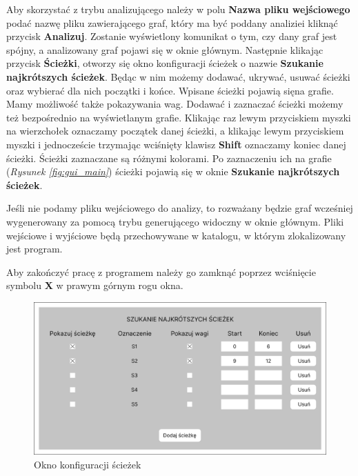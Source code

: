 \documentclass{article}
\begin{document}
\newpage

Aby skorzystać z trybu analizującego należy w polu \textbf{Nazwa pliku wejściowego} podać nazwę pliku zawierającego graf, który ma być poddany analizie\linebreak i kliknąć przycisk \textbf{Analizuj}. Zostanie wyświetlony komunikat o tym, czy dany graf jest spójny, a analizowany graf pojawi się w oknie głównym.
Następnie klikając przycisk \textbf{Ścieżki}, otworzy się okno konfiguracji ścieżek o nazwie \textbf{Szukanie najkrótszych ścieżek}. Będąc w nim możemy dodawać, ukrywać, usuwać ścieżki oraz wybierać dla nich początki i końce. Wpisane ścieżki pojawią się\linebreak na grafie. Mamy możliwość także pokazywania wag. Dodawać i zaznaczać ścieżki możemy też bezpośrednio na wyświetlanym grafie. Klikając raz lewym przyciskiem myszki na wierzchołek oznaczamy początek danej ścieżki, a klikając lewym przyciskiem myszki i jednoczeście trzymając wciśnięty klawisz \textbf{Shift} oznaczamy koniec danej ścieżki. Ścieżki zaznaczane są różnymi kolorami. Po zaznaczeniu ich na grafie (\emph{Rysunek \ref{fig:gui_main}}) ścieżki pojawią się w oknie \textbf{Szukanie najkrótszych ścieżek}.

Jeśli nie podamy pliku wejściowego do analizy, to rozważany będzie graf wcześniej wygenerowany za pomocą trybu generującego widoczny w oknie głównym. Pliki wejściowe i wyjściowe będą przechowywane w katalogu, w którym zlokalizowany jest program.

Aby zakończyć pracę z programem należy go zamknąć poprzez wciśnięcie symbolu \textbf{X} w prawym górnym rogu okna.

\begin{figure}[htp]
        \centering
        \includegraphics[width=13cm]{images/gui_paths.png}
        \caption{Okno konfiguracji ścieżek}
        \label{fig:gui_paths}
\end{figure}
\end{document}
